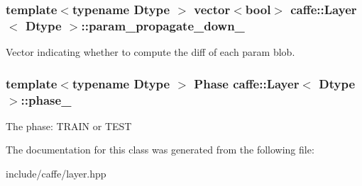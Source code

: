\subsubsection[{\texorpdfstring{param\+\_\+propagate\+\_\+down\+\_\+}{param_propagate_down_}}]{\setlength{\rightskip}{0pt plus 5cm}template$<$typename Dtype $>$ vector$<$bool$>$ {\bf caffe\+::\+Layer}$<$ Dtype $>$\+::param\+\_\+propagate\+\_\+down\+\_\+\hspace{0.3cm}{\ttfamily [protected]}}\hypertarget{classcaffe_1_1Layer_acd4a05def9ff3b42ad72404210613ef7}{}\label{classcaffe_1_1Layer_acd4a05def9ff3b42ad72404210613ef7}
Vector indicating whether to compute the diff of each param blob. 
\subsubsection[{\texorpdfstring{phase\+\_\+}{phase_}}]{\setlength{\rightskip}{0pt plus 5cm}template$<$typename Dtype $>$ Phase {\bf caffe\+::\+Layer}$<$ Dtype $>$\+::phase\+\_\+\hspace{0.3cm}{\ttfamily [protected]}}\hypertarget{classcaffe_1_1Layer_a1d04ad7f595a82a1c811f102d68b8a19}{}\label{classcaffe_1_1Layer_a1d04ad7f595a82a1c811f102d68b8a19}
The phase\+: T\+R\+A\+IN or T\+E\+ST 

The documentation for this class was generated from the following file\+:\begin{DoxyCompactItemize}
\item 
include/caffe/layer.\+hpp\end{DoxyCompactItemize}
